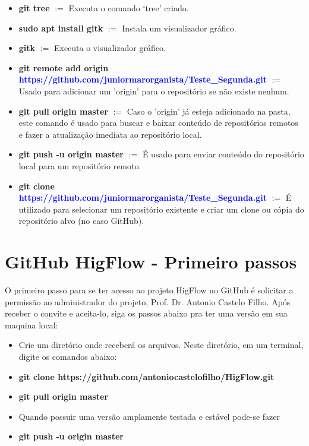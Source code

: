 \documentclass[12pt]{article}
\begin{document}
\begin{itemize}
	\item \textbf{git tree} $:=$ Executa o comando `tree' criado.
	
	\item \textbf{sudo apt install gitk} $:=$ Instala um visualizador gráfico.
	
	\item \textbf{gitk} $:=$ Executa o visualizador gráfico.
	
	\item \textbf{git remote add origin \textcolor{blue}{https://github.com/juniormarorganista/Teste\_Segunda.git}} $:=$ Usado para adicionar um 'origin' para o repositório se não existe nenhum.
	
	\item \textbf{git pull origin master} $:=$ Caso o 'origin' já esteja adicionado na pasta, este comando é usado para buscar e baixar conteúdo de repositórios remotos e fazer a atualização imediata ao repositório local.
	
	\item \textbf{git push -u origin master} $:=$ É usado para enviar conteúdo do repositório local para um repositório remoto.
	
	\item \textbf{git clone \textcolor{blue}{https://github.com/juniormarorganista/Teste\_Segunda.git}} $:=$ É utilizado para selecionar um repositório existente e criar um clone ou cópia do repositório alvo (no caso GitHub).
	
\end{itemize}

\section{GitHub HigFlow - Primeiro passos}\label{sec:github_higflow}

O primeiro passo para se ter acesso ao projeto HigFlow no GitHub é solicitar a permissão ao administrador do projeto, Prof. Dr. Antonio Castelo Filho. Após receber o convite e aceita-lo, siga os passos abaixo pra ter uma versão em sua maquina local:

\begin{itemize}
	\item Crie um diretório onde receberá os arquivos. Neste diretório, em um terminal, digite os comandos abaixo:
	
	\item \textbf{git clone https://github.com/antoniocastelofilho/HigFlow.git}
	
	\item \textbf{git pull origin master}
	
	\item Quando possuir uma versão amplamente testada e estável pode-se fazer 
	
	\item \textbf{git push -u origin master}
	
\end{itemize}



\end{document}
